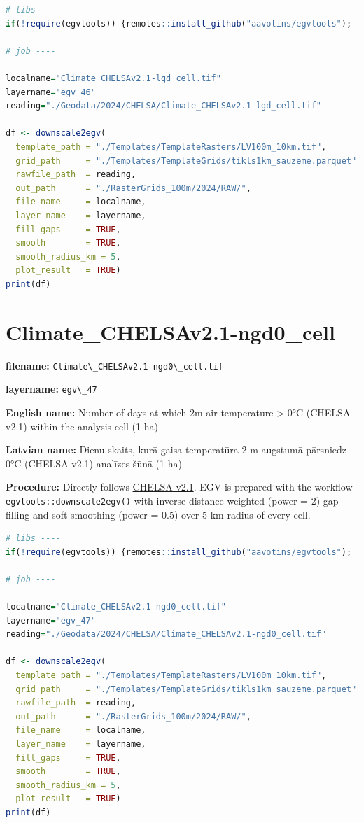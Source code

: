 \documentclass[
]{book}
\newcommand{\passthrough}[1]{#1}
\begin{document}
\begin{lstlisting}[language=R]
# libs ----
if(!require(egvtools)) {remotes::install_github("aavotins/egvtools"); require(egvtools)}

# job ----

localname="Climate_CHELSAv2.1-lgd_cell.tif"
layername="egv_46"
reading="./Geodata/2024/CHELSA/Climate_CHELSAv2.1-lgd_cell.tif"

df <- downscale2egv(
  template_path = "./Templates/TemplateRasters/LV100m_10km.tif",
  grid_path     = "./Templates/TemplateGrids/tikls1km_sauzeme.parquet",
  rawfile_path  = reading,
  out_path      = "./RasterGrids_100m/2024/RAW/",
  file_name     = localname,
  layer_name    = layername,
  fill_gaps     = TRUE,
  smooth        = TRUE,
  smooth_radius_km = 5,
  plot_result   = TRUE)
print(df)
\end{lstlisting}

\section{Climate\_CHELSAv2.1-ngd0\_cell}\label{ch06.047}

\textbf{filename:} \passthrough{\lstinline!Climate\_CHELSAv2.1-ngd0\_cell.tif!}

\textbf{layername:} \passthrough{\lstinline!egv\_47!}

\textbf{English name:} Number of days at which 2m air temperature \textgreater{} 0°C (CHELSA v2.1) within the analysis cell (1 ha)

\textbf{Latvian name:} Dienu skaits, kurā gaisa temperatūra 2 m augstumā pārsniedz 0°C (CHELSA v2.1) analīzes šūnā (1 ha)

\textbf{Procedure:} Directly follows \hyperref[Ch04.11]{CHELSA v2.1}. EGV is prepared with the
workflow \passthrough{\lstinline!egvtools::downscale2egv()!} with inverse distance weighted (power = 2)
gap filling and soft smoothing (power = 0.5) over 5 km radius of every cell.

\begin{lstlisting}[language=R]
# libs ----
if(!require(egvtools)) {remotes::install_github("aavotins/egvtools"); require(egvtools)}

# job ----

localname="Climate_CHELSAv2.1-ngd0_cell.tif"
layername="egv_47"
reading="./Geodata/2024/CHELSA/Climate_CHELSAv2.1-ngd0_cell.tif"

df <- downscale2egv(
  template_path = "./Templates/TemplateRasters/LV100m_10km.tif",
  grid_path     = "./Templates/TemplateGrids/tikls1km_sauzeme.parquet",
  rawfile_path  = reading,
  out_path      = "./RasterGrids_100m/2024/RAW/",
  file_name     = localname,
  layer_name    = layername,
  fill_gaps     = TRUE,
  smooth        = TRUE,
  smooth_radius_km = 5,
  plot_result   = TRUE)
print(df)
\end{lstlisting}
\end{document}
